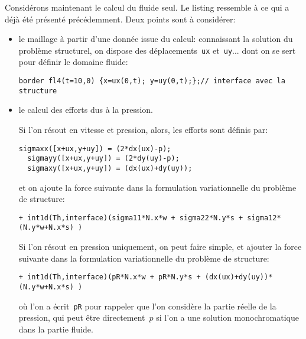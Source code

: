 \medskip
Considérons maintenant le calcul du fluide seul. Le listing ressemble à ce qui a déjà été présenté précédemment. Deux points sont à considérer:
\begin{itemize}
   \item le maillage à partir d'une donnée issue du calcul:
   connaissant la solution du problème structurel, on dispose des déplacements~\verb|ux| et~\verb|uy|... dont on se sert pour définir le domaine fluide:
  \begin{lstlisting}[numbers=none]
   border fl4(t=10,0) {x=ux(0,t); y=uy(0,t);};// interface avec la structure
  \end{lstlisting}

   \item le calcul des efforts dus à la pression.
   
   Si l'on résout en vitesse et pression, alors, les efforts sont définis par:
  \begin{lstlisting}[numbers=none]
  sigmaxx([x+ux,y+uy]) = (2*dx(ux)-p);
  sigmayy([x+ux,y+uy]) = (2*dy(uy)-p);
  sigmaxy([x+ux,y+uy]) = (dx(ux)+dy(uy));
  \end{lstlisting}
   et on ajoute la force suivante dans la formulation variationnelle du problème de structure:
  \begin{lstlisting}[numbers=none]
  + int1d(Th,interface)(sigma11*N.x*w + sigma22*N.y*s + sigma12*(N.y*w+N.x*s) ) 
  \end{lstlisting}
   
   Si l'on résout en pression uniquement, on peut faire simple, et ajouter la force suivante dans la formulation variationnelle du problème de structure:
  \begin{lstlisting}[numbers=none]
  + int1d(Th,interface)(pR*N.x*w + pR*N.y*s + (dx(ux)+dy(uy))*(N.y*w+N.x*s) )
  \end{lstlisting}

   où l'on a écrit~\verb|pR| pour rappeler que l'on considère la partie réelle de la pression, qui peut être directement~$p$ si l'on a une solution monochromatique dans la partie fluide.
\end{itemize}


